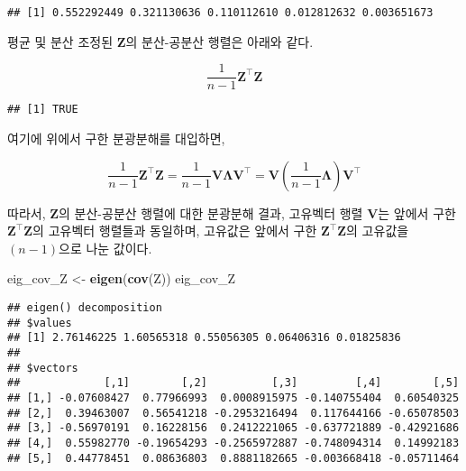 \documentclass[]{book}
\newenvironment{Shaded}{\begin{snugshade}}{\end{snugshade}}
\newcommand{\DecValTok}[1]{\textcolor[rgb]{0.00,0.00,0.81}{#1}}
\newcommand{\KeywordTok}[1]{\textcolor[rgb]{0.13,0.29,0.53}{\textbf{#1}}}
\newcommand{\NormalTok}[1]{#1}
\newcommand{\OperatorTok}[1]{\textcolor[rgb]{0.81,0.36,0.00}{\textbf{#1}}}
\newcommand{\StringTok}[1]{\textcolor[rgb]{0.31,0.60,0.02}{#1}}
\begin{document}
\begin{verbatim}
## [1] 0.552292449 0.321130636 0.110112610 0.012812632 0.003651673
\end{verbatim}

평균 및 분산 조정된 \(\mathbf{Z}\)의 분산-공분산 행렬은 아래와 같다.

\[\frac{1}{n - 1} \mathbf{Z}^\top \mathbf{Z}\]

\begin{Shaded}
\end{Shaded}

\begin{verbatim}
## [1] TRUE
\end{verbatim}

여기에 위에서 구한 분광분해를 대입하면,

\[\frac{1}{n - 1} \mathbf{Z}^\top \mathbf{Z} = \frac{1}{n - 1} \mathbf{V} \mathbf{\Lambda} \mathbf{V}^\top =  \mathbf{V} \left( \frac{1}{n - 1} \mathbf{\Lambda} \right) \mathbf{V}^\top\]

따라서, \(\mathbf{Z}\)의 분산-공분산 행렬에 대한 분광분해 결과, 고유벡터 행렬 \(\mathbf{V}\)는 앞에서 구한 \(\mathbf{Z}^\top \mathbf{Z}\)의 고유벡터 행렬들과 동일하며, 고유값은 앞에서 구한 \(\mathbf{Z}^\top \mathbf{Z}\)의 고유값을 \((n - 1)\)으로 나눈 값이다.

\begin{Shaded}
\begin{Highlighting}[]
\NormalTok{eig_cov_Z <-}\StringTok{ }\KeywordTok{eigen}\NormalTok{(}\KeywordTok{cov}\NormalTok{(Z))}
\NormalTok{eig_cov_Z}
\end{Highlighting}
\end{Shaded}

\begin{verbatim}
## eigen() decomposition
## $values
## [1] 2.76146225 1.60565318 0.55056305 0.06406316 0.01825836
## 
## $vectors
##             [,1]        [,2]          [,3]         [,4]        [,5]
## [1,] -0.07608427  0.77966993  0.0008915975 -0.140755404  0.60540325
## [2,]  0.39463007  0.56541218 -0.2953216494  0.117644166 -0.65078503
## [3,] -0.56970191  0.16228156  0.2412221065 -0.637721889 -0.42921686
## [4,]  0.55982770 -0.19654293 -0.2565972887 -0.748094314  0.14992183
## [5,]  0.44778451  0.08636803  0.8881182665 -0.003668418 -0.05711464
\end{verbatim}
\end{document}
